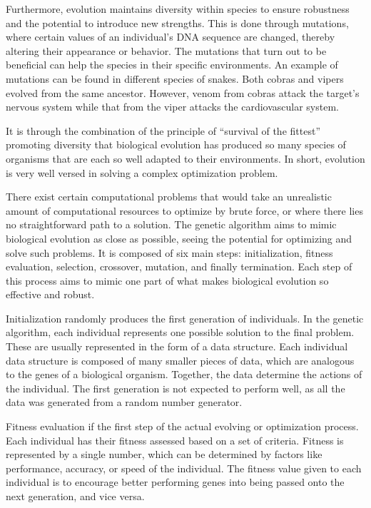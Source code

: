 \documentclass[12pt]{article}
\begin{document}
Furthermore, evolution maintains diversity within species to ensure robustness and the potential to introduce new strengths. This is done through mutations, where certain values of an individual's DNA sequence are changed, thereby altering their appearance or behavior. The mutations that turn out to be beneficial can help the species in their specific environments. An example of mutations can be found in different species of snakes. Both cobras and vipers evolved from the same ancestor. However, venom from cobras attack the target's nervous system while that from the viper attacks the cardiovascular system.

It is through the combination of the principle of ``survival of the fittest'' promoting diversity that biological evolution has produced so many species of organisms that are each so well adapted to their environments. In short, evolution is very well versed in solving a complex optimization problem.

There exist certain computational problems that would take an unrealistic amount of computational resources to optimize by brute force, or where there lies no straightforward path to a solution. The genetic algorithm aims to mimic biological evolution as close as possible, seeing the potential for optimizing and solve such problems. It is composed of six main steps: initialization, fitness evaluation, selection, crossover, mutation, and finally termination. Each step of this process aims to mimic one part of what makes biological evolution so effective and robust.

Initialization randomly produces the first generation of individuals. In the genetic algorithm, each individual represents one possible solution to the final problem. These are usually represented in the form of a data structure. Each individual data structure is composed of many smaller pieces of data, which are analogous to the genes of a biological organism. Together, the data determine the actions of the individual. The first generation is not expected to perform well, as all the data was generated from a random number generator.

Fitness evaluation if the first step of the actual evolving or optimization process. Each individual has their fitness assessed based on a set of criteria. Fitness is represented by a single number, which can be determined by factors like performance, accuracy, or speed of the individual. The fitness value given to each individual is to encourage better performing genes into being passed onto the next generation, and vice versa.
\end{document}
